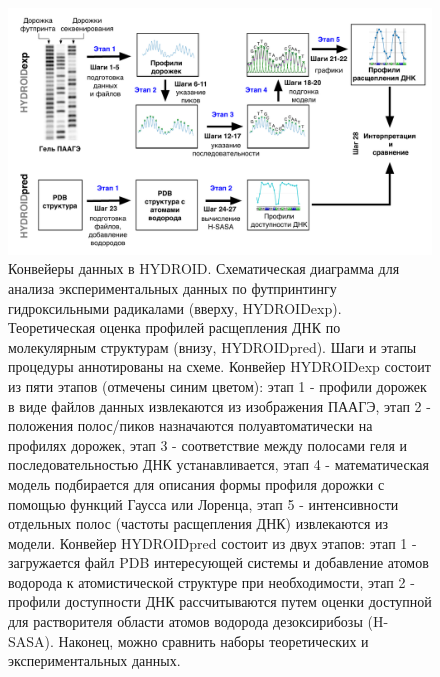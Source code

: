 \begin{figure} [H]
    \centering
    \includegraphics[width=\textwidth]{images/p5/part5_1_np/p5_1_f2.pdf}
    \caption[Конвейеры данных в HYDROID]{Конвейеры данных в HYDROID. Схематическая диаграмма для анализа экспериментальных данных по футпринтингу гидроксильными радикалами (вверху, HYDROIDexp). Теоретическая оценка профилей расщепления ДНК по молекулярным структурам (внизу, HYDROIDpred). Шаги и этапы процедуры аннотированы на схеме. Конвейер HYDROIDexp состоит из пяти этапов (отмечены синим цветом): этап 1 - профили дорожек в виде файлов данных извлекаются из изображения ПААГЭ, этап 2 - положения полос/пиков назначаются полуавтоматически на профилях дорожек, этап 3 - соответствие между полосами геля и последовательностью ДНК устанавливается, этап 4 - математическая модель подбирается для описания формы профиля дорожки с помощью функций Гаусса или Лоренца, этап 5 - интенсивности отдельных полос (частоты расщепления ДНК) извлекаются из модели. Конвейер HYDROIDpred состоит из двух этапов: этап 1 - загружается файл PDB интересующей системы и добавление атомов водорода к атомистической структуре при необходимости, этап 2 - профили доступности ДНК рассчитываются путем оценки доступной для растворителя области атомов водорода дезоксирибозы (H-SASA). Наконец, можно сравнить наборы теоретических и экспериментальных данных.}
    \label{fig:p5_1_f2}
\end{figure}




